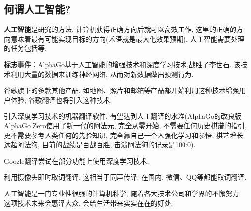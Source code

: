 \subsection{何谓人工智能?}
\begin{tcolorbox}[colback=white!50, colframe=orange!50, title=UC Berkely人工智能系统中心创始人兼计算机科学专业教授Stuart Russell]
\begin{center}
   \textbf{人工智能}是研究的方法. 计算机获得正确方向后就可以高效工作, 这里的正确的方向意味着最有可能实现目标的方向(术语就是最大化效果预期).
   人工智能需要处理的任务包括等.\hfill
\end{center}
\end{tcolorbox}

\textbf{标志事件}：AlphaGo基于人工智能的增强技术和深度学习技术,战胜了李世石. 该技术利用大量的数据来训练神经网络, 从而对新数据做出预测行为.

     谷歌旗下的多款其他产品, 如地图、照片和邮箱等产品都开始利用这种技术增强用户体验; 谷歌翻译也将引入这种技术.

     引入深度学习技术的机器翻译软件, 有望达到人工翻译的水准(AlphaGo的改良版AlphaGo Zero使用了新一代的阿法元, 完全从零开始, 不需要任何历史棋谱的指引, 更不需要参考人类任何的先验知识, 完全靠自己一个人强化学习和参悟, 棋艺增长远超阿法狗, 目前的战绩是百战百胜, 击溃阿法狗的记录是100:0).

     Google翻译尝试在部分功能上使用深度学习技术,
     \begin{example}
       利用摄像头即时取词翻译, 这相当于同声传译. 在国内, 微信、QQ等都能取词翻译.
     \end{example}
\begin{remark}
  人工智能是一门专业性很强的计算机科学, 随着各大技术公司和学界的不懈努力, 这项技术未来会惠泽大众, 会给生活带来实实在在的好处.
\end{remark}


